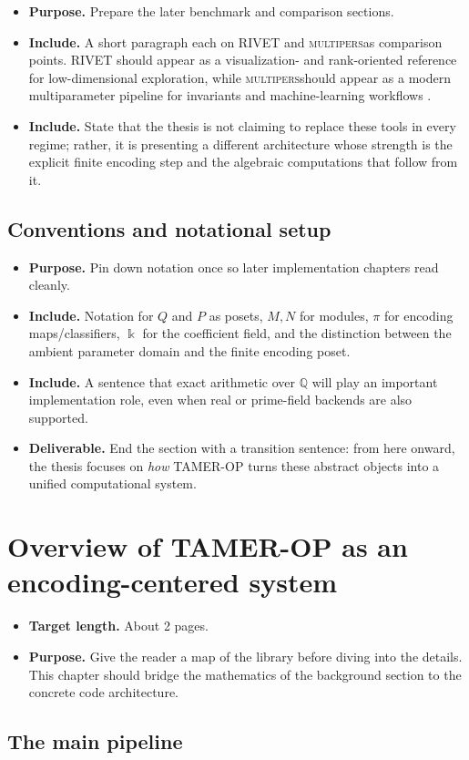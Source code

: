 \documentclass[11pt]{article}
\newcommand{\kk}{\Bbbk}
\newcommand{\TAMER}{\textsc{TAMER-OP}}
\newcommand{\multipers}{\textsc{multipers}}
\newenvironment{plan}{\begin{itemize}[leftmargin=1.6em,itemsep=0.35em,topsep=0.25em]}{\end{itemize}}
\newcommand{\target}[1]{\item \textbf{Target length.} #1}
\newcommand{\purpose}[1]{\item \textbf{Purpose.} #1}
\newcommand{\includeitems}[1]{\item \textbf{Include.} #1}
\newcommand{\deliverable}[1]{\item \textbf{Deliverable.} #1}
\begin{document}
\begin{plan}
    \purpose{Prepare the later benchmark and comparison sections.}
    \includeitems{A short paragraph each on RIVET and \multipers as comparison points. RIVET should appear as a visualization- and rank-oriented reference for low-dimensional exploration, while \multipers should appear as a modern multiparameter pipeline for invariants and machine-learning workflows \cite{LW15,RIVET,LS24}.}
    \includeitems{State that the thesis is not claiming to replace these tools in every regime; rather, it is presenting a different architecture whose strength is the explicit finite encoding step and the algebraic computations that follow from it.}
\end{plan}

\subsection{Conventions and notational setup}

\begin{plan}
    \purpose{Pin down notation once so later implementation chapters read cleanly.}
    \includeitems{Notation for $Q$ and $P$ as posets, $M,N$ for modules, $\pi$ for encoding maps/classifiers, $\kk$ for the coefficient field, and the distinction between the ambient parameter domain and the finite encoding poset.}
    \includeitems{A sentence that exact arithmetic over $\mathbb{Q}$ will play an important implementation role, even when real or prime-field backends are also supported.}
    \deliverable{End the section with a transition sentence: from here onward, the thesis focuses on \emph{how} \TAMER{} turns these abstract objects into a unified computational system.}
\end{plan}

\section{Overview of \TAMER{} as an encoding-centered system}\label{sec:system-overview}

\begin{plan}
    \target{About 2 pages.}
    \purpose{Give the reader a map of the library before diving into the details. This chapter should bridge the mathematics of the background section to the concrete code architecture.}
\end{plan}

\subsection{The main pipeline}
\end{document}
